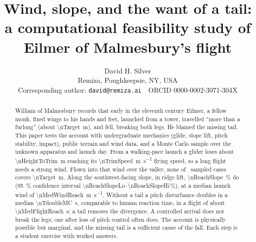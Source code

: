 \documentclass[11pt]{article}
\title{\bfseries Wind, slope, and the want of a tail:\\
a computational feasibility study of Eilmer of Malmesbury's flight}
\author{}
\author{David H. Silver \\[3pt]
    {\normalsize Remiza, Poughkeepsie, NY, USA} \\[1pt]
    {\small Corresponding author: \texttt{david@remiza.ai} \,\textperiodcentered\, ORCID 0000-0002-3071-304X}}
\date{}
\begin{document}
\maketitle

\begin{abstract}
\noindent
William of Malmesbury records that early in the eleventh century Eilmer, a fellow monk,
fixed wings to his hands and feet, launched from a tower, travelled ``more than a furlong''
(about \SI{\nTarget}{\meter}), and fell, breaking both legs.
He blamed the missing tail.
This paper tests the account with undergraduate mechanics (glide, slope lift, pitch
stability, impact), public terrain and wind data, and a Monte Carlo sample over the unknown
apparatus and launch day.
From a walking-pace launch a glider loses about \SI{\nHeightToTrim}{\meter} reaching its
\SI{\nTrimSpeed}{\meter\per\second} flying speed, so a long flight needs a strong wind.
Flown into that wind over the valley, none of \nSamples\ sampled cases covers
\SI{\nTarget}{\meter}.
Along the southwest-facing slope, in ridge lift, \SI{\nReachSlope}{\percent} do
(\SI{95}{\percent} confidence interval \numrange{\nReachSlopeLo}{\nReachSlopeHi}\,\%), at a
median launch wind of \SI{\nMedWindReach}{\meter\per\second}.
Without a tail a pitch disturbance doubles in a median \SI{\nTdoubleMC}{\second}, comparable
to human reaction time, in a flight of about \SI{\nMedFlightReach}{\second}; a tail removes
the divergence.
A controlled arrival does not break the legs; one after loss of pitch control often does.
The account is physically possible but marginal, and the missing tail is a sufficient cause
of the fall.
Each step is a student exercise with worked answers.
\end{abstract}









\printbibliography
\end{document}
